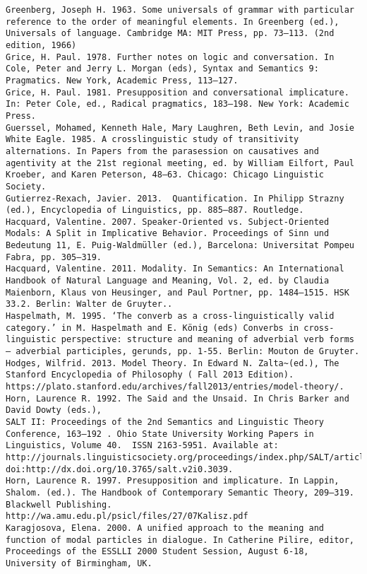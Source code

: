 \begin{verbatim}
Greenberg, Joseph H. 1963. Some universals of grammar with particular reference to the order of meaningful elements. In Greenberg (ed.), Universals of language. Cambridge MA: MIT Press, pp. 73–113. (2nd edition, 1966)
Grice, H. Paul. 1978. Further notes on logic and conversation. In Cole, Peter and Jerry L. Morgan (eds), Syntax and Semantics 9: Pragmatics. New York, Academic Press, 113–127.
Grice, H. Paul. 1981. Presupposition and conversational implicature. In: Peter Cole, ed., Radical pragmatics, 183–198. New York: Academic Press.
Guerssel, Mohamed, Kenneth Hale, Mary Laughren, Beth Levin, and Josie White Eagle. 1985. A crosslinguistic study of transitivity alternations. In Papers from the parasession on causatives and agentivity at the 21st regional meeting, ed. by William Eilfort, Paul Kroeber, and Karen Peterson, 48–63. Chicago: Chicago Linguistic Society.
Gutierrez-Rexach, Javier. 2013.  Quantification. In Philipp Strazny (ed.), Encyclopedia of Linguistics, pp. 885–887. Routledge.
Hacquard, Valentine. 2007. Speaker-Oriented vs. Subject-Oriented Modals: A Split in Implicative Behavior. Proceedings of Sinn und Bedeutung 11, E. Puig-Waldmüller (ed.), Barcelona: Universitat Pompeu Fabra, pp. 305–319.
Hacquard, Valentine. 2011. Modality. In Semantics: An International Handbook of Natural Language and Meaning, Vol. 2, ed. by Claudia Maienborn, Klaus von Heusinger, and Paul Portner, pp. 1484–1515. HSK 33.2. Berlin: Walter de Gruyter..
Haspelmath, M. 1995. ‘The converb as a cross-linguistically valid category.’ in M. Haspelmath and E. König (eds) Converbs in cross-linguistic perspective: structure and meaning of adverbial verb forms – adverbial participles, gerunds, pp. 1-55. Berlin: Mouton de Gruyter.
Hodges, Wilfrid. 2013. Model Theory. In Edward N. Zalta~(ed.), The Stanford Encyclopedia of Philosophy ( Fall 2013 Edition). https://plato.stanford.edu/archives/fall2013/entries/model-theory/.
Horn, Laurence R. 1992. The Said and the Unsaid. In Chris Barker and David Dowty (eds.),
SALT II: Proceedings of the 2nd Semantics and Linguistic Theory Conference, 163–192 . Ohio State University Working Papers in Linguistics, Volume 40.  ISSN 2163-5951. Available at: http://journals.linguisticsociety.org/proceedings/index.php/SALT/article/view/3039/2782. doi:http://dx.doi.org/10.3765/salt.v2i0.3039.
Horn, Laurence R. 1997. Presupposition and implicature. In Lappin, Shalom. (ed.). The Handbook of Contemporary Semantic Theory, 209–319. Blackwell Publishing.
http://wa.amu.edu.pl/psicl/files/27/07Kalisz.pdf
Karagjosova, Elena. 2000. A unified approach to the meaning and function of modal particles in dialogue. In Catherine Pilire, editor, Proceedings of the ESSLLI 2000 Student Session, August 6-18, University of Birmingham, UK.

\end{verbatim}
